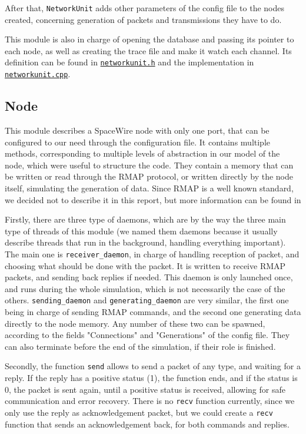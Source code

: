 \documentclass[12pt,a4paper]{article}
\begin{document}
After that, \texttt{NetworkUnit} adds other parameters of the config file to the nodes created, concerning generation of packets and transmissions they have to do.

This module is also in charge of opening the database and passing its pointer to each node, as well as creating the trace file and make it watch each channel. Its definition can be found in \href{https://github.com/suai-ipsa2018/ExoMars2020/blob/master/ExoMars2020/Network/networkunit.h}{\texttt{networkunit.h}} and the implementation in \href{https://github.com/suai-ipsa2018/ExoMars2020/blob/master/ExoMars2020/Network/networkunit.cpp}{\texttt{networkunit.cpp}}.

\subsection{Node}
\label{ssec:Node}
This module describes a SpaceWire node with only one port, that can be configured to our need through the configuration file. It contains multiple methods, corresponding to multiple levels of abstraction in our model of the node, which were useful to structure the code. They contain a memory that can be written or read through the RMAP protocol, or written directly by the node itself, simulating the generation of data. Since RMAP is a well known standard, we decided not to describe it in this report, but more information can be found in \cite{RMAP}\medbreak

Firstly, there are three type of daemons, which are by the way the three main type of threads of this module (we named them daemons because it usually describe threads that run in the background, handling everything important). The main one is \texttt{receiver\_daemon}, in charge of handling reception of packet, and choosing what should be done with the packet. It is written to receive RMAP packets, and sending back replies if needed. This daemon is only launched once, and runs during the whole simulation, which is not necessarily the case of the others. \texttt{sending\_daemon} and \texttt{generating\_daemon} are very similar, the first one being in charge of sending RMAP commands, and the second one generating data directly to the node memory. Any number of these two can be spawned, according to the fields "Connections" and "Generations" of the config file. They can also terminate before the end of the simulation, if their role is finished.

Secondly, the function \texttt{send} allows to send a packet of any type, and waiting for a reply. If the reply has a positive status (1), the function ends, and if the status is 0, the packet is sent again, until a positive status is received, allowing for safe communication and error recovery. There is no \texttt{recv} function currently, since we only use the reply as acknowledgement packet, but we could create a \texttt{recv} function that sends an acknowledgement back, for both commands and replies.
\end{document}
